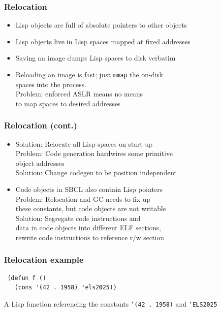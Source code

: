 \documentclass[14pt,t,aspectratio=169]{beamer}
\def\code#1{{\color{codecolor}\texttt{#1}}}
\begin{document}
\begin{frame}
  \frametitle{Relocation}
  \begin{itemize}
  \item Lisp objects are full of absolute pointers to other objects
  \item Lisp objects live in Lisp spaces mapped at fixed addresses
  \item Saving an image dumps Lisp spaces to disk verbatim
  \item Reloading an image is fast; just \texttt{mmap} the on-disk \\
    spaces into the process. \\
    \textcolor{red}{\Rightarrow} Problem: enforced ASLR means no means \\
    \quad to map spaces to desired addresses
  \end{itemize}
\end{frame}

\begin{frame}
  \frametitle{Relocation (cont.)}
  \begin{itemize}
    \item Solution: Relocate all Lisp spaces on start up \\
      \textcolor{red}{\Rightarrow} Problem: Code generation hardwires some primitive \\
      \quad object addresses \\
      \Rightarrow{} Solution: Change codegen to be position independent
    \item Code objects in SBCL also contain Lisp pointers \\
      \textcolor{red}{\Rightarrow} Problem: Relocation and GC needs to fix up \\
      \quad these constants, but code objects are not writable \\
      \Rightarrow{} Solution: Segregate code instructions and \\
      \quad data in code objects into different ELF sections, \\
      \quad rewrite code instructions to reference r/w section
  \end{itemize}
\end{frame}

\begin{frame}[fragile]
  \frametitle{Relocation example}
\begin{verbatim}
 (defun f ()
   (cons '(42 . 1958) 'els2025))
\end{verbatim}
  A Lisp function referencing the constants \code{'(42 . 1958)} and \code{'ELS2025}
\end{frame}
\end{document}
